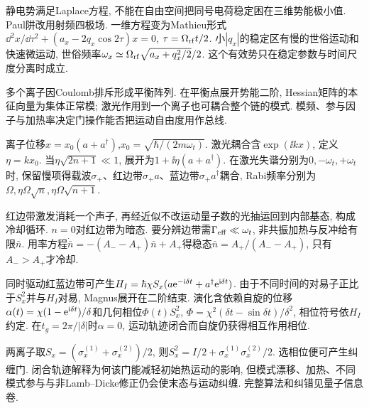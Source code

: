 静电势满足Laplace方程, 不能在自由空间把同号电荷稳定困在三维势能极小值. Paul阱改用射频四极场. 一维方程变为Mathieu形式$\dd^2x/\dd\tau^2+(a_x-2q_x\cos2\tau)x=0$, $\tau=\Omega_{\rm rf}t/2$. 小$|q_x|$的稳定区有慢的世俗运动和快速微运动, 世俗频率$\omega_x\simeq\Omega_{\rm rf}\sqrt{a_x+q_x^2/2}/2$. 这个有效势只在稳定参数与时间尺度分离时成立.

多个离子因Coulomb排斥形成平衡阵列. 在平衡点展开势能二阶, Hessian矩阵的本征向量为集体正常模; 激光作用到一个离子也可耦合整个链的模式. 模频、参与因子与加热率决定门操作能否把运动自由度用作总线.

离子位移$x=x_0(a+a^\dagger)$,$x_0=\sqrt{\hbar/(2m\omega_t)}$. 激光耦合含$\exp(\ii kx)$, 定义$\eta=kx_0$. 当$\eta\sqrt{2n+1}\ll1$, 展开为$1+\ii\eta(a+a^\dagger)$. 在激光失谐分别为$0,-\omega_t,+\omega_t$时, 保留慢项得载波$\sigma_+$、红边带$\sigma_+a$、蓝边带$\sigma_+a^\dagger$耦合, Rabi频率分别为$\Omega,\eta\Omega\sqrt n,\eta\Omega\sqrt{n+1}$.

红边带激发消耗一个声子, 再经近似不改运动量子数的光抽运回到内部基态, 构成冷却循环. $n=0$对红边带为暗态. 要分辨边带需$\Gamma_{\rm eff}\ll\omega_t$, 非共振加热与反冲给有限$\bar n$. 用率方程$\dot{\bar n}=-(A_--A_+)\bar n+A_+$得稳态$\bar n=A_+/(A_--A_+)$, 只有$A_->A_+$才冷却.

同时驱动红蓝边带可产生$H_I=\hbar\chi S_x(a\mathrm e^{-\mathrm i\delta t}+a^\dagger\mathrm e^{\mathrm i\delta t})$. 由于不同时间的对易子正比于$S_x^2$并与$H_I$对易, Magnus展开在二阶结束. 演化含依赖自旋的位移$\alpha(t)=\chi(1-\mathrm e^{\mathrm i\delta t})/\delta$和几何相位$\Phi(t)S_x^2$, $\Phi=\chi^2(\delta t-\sin\delta t)/\delta^2$, 相位符号依$H_I$约定. 在$t_g=2\pi/|\delta|$时$\alpha=0$, 运动轨迹闭合而自旋仍获得相互作用相位.

两离子取$S_x=(\sigma_x^{(1)}+\sigma_x^{(2)})/2$, 则$S_x^2=I/2+\sigma_x^{(1)}\sigma_x^{(2)}/2$. 选相位便可产生纠缠门. 闭合轨迹解释为何该门能减轻初始热运动的影响, 但模式漂移、加热、不同模式参与与非Lamb--Dicke修正仍会使末态与运动纠缠. 完整算法和纠错见量子信息卷.

